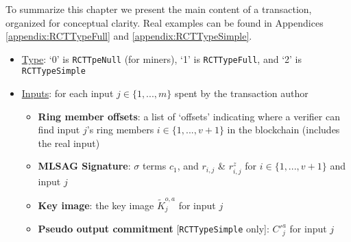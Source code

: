 To summarize this chapter we present the main content of a transaction, organized for conceptual clarity. Real examples can be found in Appendices \ref{appendix:RCTTypeFull} and \ref{appendix:RCTTypeSimple}.

\begin{itemize}
    \item \underline{Type}: `0' is {\tt RCTTpeNull} (for miners), `1' is {\tt RCTTypeFull}, and `2' is {\tt RCTTypeSimple} %
    \item \underline{Inputs}: for each input $j \in \{1,...,m\}$ spent by the transaction author
    \begin{itemize}
        \item \textbf{Ring member offsets}: a list of `offsets' indicating where a verifier can find input $j$'s ring members $i \in \{1,...,v+1\}$ in the blockchain (includes the real input)
        \item \textbf{MLSAG Signature}: $\sigma$ terms $c_1$, and $r_{i,j}$ \& $r^{z}_{i,j}$ for $i \in \{1,...,v+1\}$ and input $j$
        \item \textbf{Key image}: the key image $\tilde{K}^{o,a}_j$ for input $j$
        \item \textbf{Pseudo output commitment} {[{\tt RCTTypeSimple} only]}: $C'^{a}_j$ for input $j$
    \end{itemize}
    

\end{itemize}
